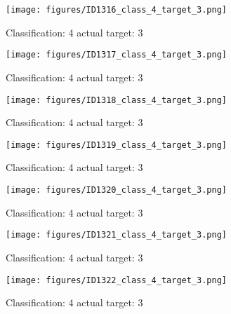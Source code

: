 \begin{figure}[h!]
\begin{center}
\texttt{[image: figures/ID1316\_class\_4\_target\_3.png]}
\end{center}
\caption{ Classification: 4 actual target: 3}
\label{fig:ID1316_class_4_target_3}
\end{figure}
\begin{figure}[h!]
\begin{center}
\texttt{[image: figures/ID1317\_class\_4\_target\_3.png]}
\end{center}
\caption{ Classification: 4 actual target: 3}
\label{fig:ID1317_class_4_target_3}
\end{figure}
\begin{figure}[h!]
\begin{center}
\texttt{[image: figures/ID1318\_class\_4\_target\_3.png]}
\end{center}
\caption{ Classification: 4 actual target: 3}
\label{fig:ID1318_class_4_target_3}
\end{figure}
\begin{figure}[h!]
\begin{center}
\texttt{[image: figures/ID1319\_class\_4\_target\_3.png]}
\end{center}
\caption{ Classification: 4 actual target: 3}
\label{fig:ID1319_class_4_target_3}
\end{figure}
\begin{figure}[h!]
\begin{center}
\texttt{[image: figures/ID1320\_class\_4\_target\_3.png]}
\end{center}
\caption{ Classification: 4 actual target: 3}
\label{fig:ID1320_class_4_target_3}
\end{figure}
\begin{figure}[h!]
\begin{center}
\texttt{[image: figures/ID1321\_class\_4\_target\_3.png]}
\end{center}
\caption{ Classification: 4 actual target: 3}
\label{fig:ID1321_class_4_target_3}
\end{figure}
\begin{figure}[h!]
\begin{center}
\texttt{[image: figures/ID1322\_class\_4\_target\_3.png]}
\end{center}
\caption{ Classification: 4 actual target: 3}
\label{fig:ID1322_class_4_target_3}
\end{figure}
